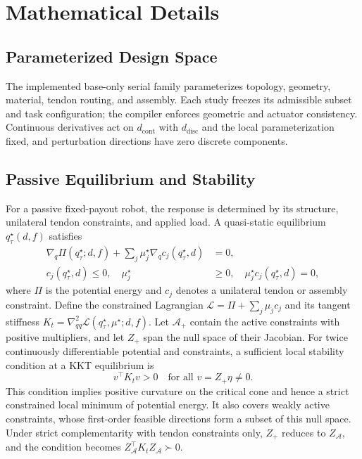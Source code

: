\section{Mathematical Details}
\label{app:mathematical-details}

\subsection{Parameterized Design Space}
\label{app:design-space}
The implemented base-only serial family parameterizes topology, geometry, material, tendon routing, and assembly. Each study freezes its admissible subset and task configuration; the compiler enforces geometric and actuator consistency. Continuous derivatives act on $d_{\mathrm{cont}}$ with $d_{\mathrm{disc}}$ and the local parameterization fixed, and perturbation directions have zero discrete components.

\subsection{Passive Equilibrium and Stability}
\label{app:passive-stability}
For a passive fixed-payout robot, the response is determined by its structure, unilateral tendon constraints, and applied load. A quasi-static equilibrium $q^\star_\tau(d,f)$ satisfies
\begin{equation}
\begin{aligned}
\nabla_q\Pi(q^\star_\tau;d,f)
+\sum_j\mu^\star_j\nabla_q c_j(q^\star_\tau,d)&=0,\\
c_j(q^\star_\tau,d)\leq0,\quad
\mu^\star_j&\geq0,\quad
\mu^\star_jc_j(q^\star_\tau,d)=0,
\end{aligned}
\label{eq:passive-problem}
\end{equation}
where $\Pi$ is the potential energy and $c_j$ denotes a unilateral tendon or assembly constraint. Define the constrained Lagrangian $\mathcal L=\Pi+\sum_j\mu_jc_j$ and its tangent stiffness $K_t=\nabla_{qq}^2\mathcal L(q^\star_\tau,\mu^\star;d,f)$. Let $\mathcal A_+$ contain the active constraints with positive multipliers, and let $Z_+$ span the null space of their Jacobian. For twice continuously differentiable potential and constraints, a sufficient local stability condition at a KKT equilibrium is
\begin{equation}
v^\top K_t v>0\quad\text{for all }v=Z_+\eta\ne0.
\label{eq:passive-stability}
\end{equation}
This condition implies positive curvature on the critical cone and hence a strict constrained local minimum of potential energy. It also covers weakly active constraints, whose first-order feasible directions form a subset of this null space. Under strict complementarity with tendon constraints only, $Z_+$ reduces to $Z_{\mathcal A}$, and the condition becomes $Z_{\mathcal A}^\top K_tZ_{\mathcal A}\succ0$.

